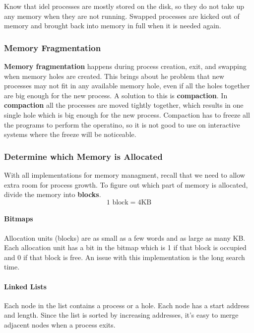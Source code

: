 \documentclass{article}
\newcommand{\bold}[1]{\textbf{#1}}
\begin{document}
Know that idel processes are mostly stored on the disk, so they do not take up any memory when they are not running. Swapped processes are kicked out of memory and brought back into memory in full when it is needed again. 

\subsubsection{Memory Fragmentation}

\bold{Memory fragmentation} happens during process creation, exit, and swapping when memory holes are created. This brings about he problem that new processes may not fit in any available memory hole, even if all the holes together are big enough for the new process. A solution to this is \bold{compaction}. In \bold{compaction} all the processes are moved tightly together, which results in one single hole which is big enough for the new process. Compaction has to freeze all the programs to perform the operatino, so it is not good to use on interactive systems where the freeze will be noticeable. \\ 

\subsubsection{Determine which Memory is Allocated}

With all implementations for memory managment, recall that we need to allow extra room for process growth. To figure out which part of memory is allocated, divide the memory into \bold{blocks}. $$\textrm{1 block} = 4 \textrm{KB}$$

\paragraph{Bitmaps}

Allocation units (blocks) are as small as a few words and as large as many KB. Each allocation unit has a bit in the bitmap which is 1 if that block is occupied and 0 if that block is free. An issue with this implementation is the long search time. 

\paragraph{Linked Lists}

Each node in the list contains a process or a hole. Each node has a start address and length. Since the list is sorted by increasing addresses, it's easy to merge adjacent nodes when a process exits. 
\end{document}
